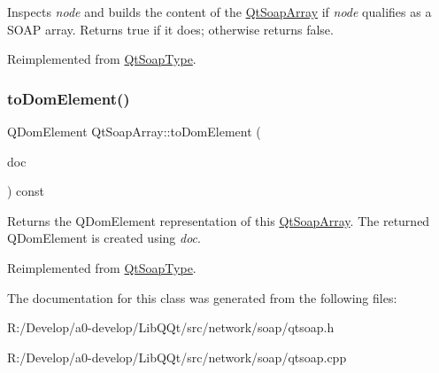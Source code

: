 Inspects {\itshape node} and builds the content of the \mbox{\hyperlink{class_qt_soap_array}{Qt\+Soap\+Array}} if {\itshape node} qualifies as a S\+O\+AP array. Returns true if it does; otherwise returns false. 

Reimplemented from \mbox{\hyperlink{class_qt_soap_type_a935516be4d70dda7e0f7fef889b1a2b8}{Qt\+Soap\+Type}}.

\mbox{\label{class_qt_soap_array_afd48e465aad1088003c1cc7024b99e81}} 
\subsubsection{\texorpdfstring{to\+Dom\+Element()}{toDomElement()}}
{\footnotesize\ttfamily Q\+Dom\+Element Qt\+Soap\+Array\+::to\+Dom\+Element (\begin{DoxyParamCaption}\item[{Q\+Dom\+Document}]{doc }\end{DoxyParamCaption}) const\hspace{0.3cm}{\ttfamily [virtual]}}

Returns the Q\+Dom\+Element representation of this \mbox{\hyperlink{class_qt_soap_array}{Qt\+Soap\+Array}}. The returned Q\+Dom\+Element is created using {\itshape doc}. 

Reimplemented from \mbox{\hyperlink{class_qt_soap_type_a77b7274ffbc9374187a2cc8cca27cdb6}{Qt\+Soap\+Type}}.



The documentation for this class was generated from the following files\+:\begin{DoxyCompactItemize}
\item 
R\+:/\+Develop/a0-\/develop/\+Lib\+Q\+Qt/src/network/soap/qtsoap.\+h\item 
R\+:/\+Develop/a0-\/develop/\+Lib\+Q\+Qt/src/network/soap/qtsoap.\+cpp\end{DoxyCompactItemize}

